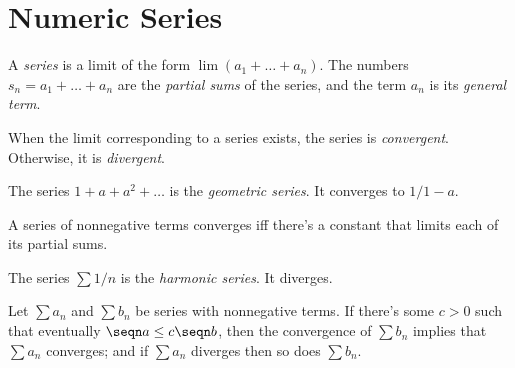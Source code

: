 \setcounter{chapter}{3}
\chapter{Numeric Series}

\begin{definition}
	A \emph{series} is a limit of the form $\lim (a_1 + \dots + a_n)$.
	The numbers $s_n = a_1 + \dots + a_n$ are the \emph{partial sums} of the series, 
	and the term $a_n$ is its \emph{general term}.
\end{definition}

\begin{definition}[Congervence]
	When the limit corresponding to a series exists, the series is \emph{convergent}.
	Otherwise, it is \emph{divergent}.
\end{definition}

\begin{fact}
	The series $1 + a + a^2 + \dots$ is the \emph{geometric series}. It converges to $1/1-a$.
\end{fact}

\begin{fact}
	A series of nonnegative terms converges iff there's a constant that limits
	each of its partial sums.  
\end{fact}

\begin{fact}
	The series $\sum 1/n$ is the \emph{harmonic series}. It diverges.
\end{fact}

\begin{theorem}
	Let $\sum a_n$ and $\sum b_n$ be series with nonnegative terms. If there's some $c>0$
	such that eventually $\seqn a \le c\seqn b$, then the convergence of $\sum b_n$
	implies that $\sum a_n$ converges; and if $\sum a_n$ diverges then so does $\sum b_n$.
\end{theorem}
